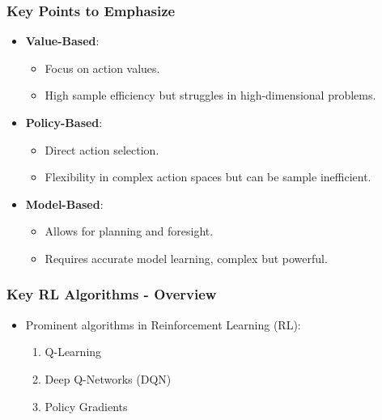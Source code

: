 \documentclass[aspectratio=169]{beamer}
\begin{document}
\begin{frame}[fragile]
    \frametitle{Key Points to Emphasize}
    \begin{itemize}
        \item \textbf{Value-Based}:
            \begin{itemize}
                \item Focus on action values.
                \item High sample efficiency but struggles in high-dimensional problems.
            \end{itemize}
        \item \textbf{Policy-Based}:
            \begin{itemize}
                \item Direct action selection.
                \item Flexibility in complex action spaces but can be sample inefficient.
            \end{itemize}
        \item \textbf{Model-Based}:
            \begin{itemize}
                \item Allows for planning and foresight.
                \item Requires accurate model learning, complex but powerful.
            \end{itemize}
    \end{itemize}
\end{frame}

\begin{frame}
    \titlepage
\end{frame}

\begin{frame}[fragile]
    \frametitle{Key RL Algorithms - Overview}
    \begin{itemize}
        \item Prominent algorithms in Reinforcement Learning (RL):
        \begin{enumerate}
            \item Q-Learning
            \item Deep Q-Networks (DQN)
            \item Policy Gradients
        \end{enumerate}
    \end{itemize}
\end{frame}
\end{document}
